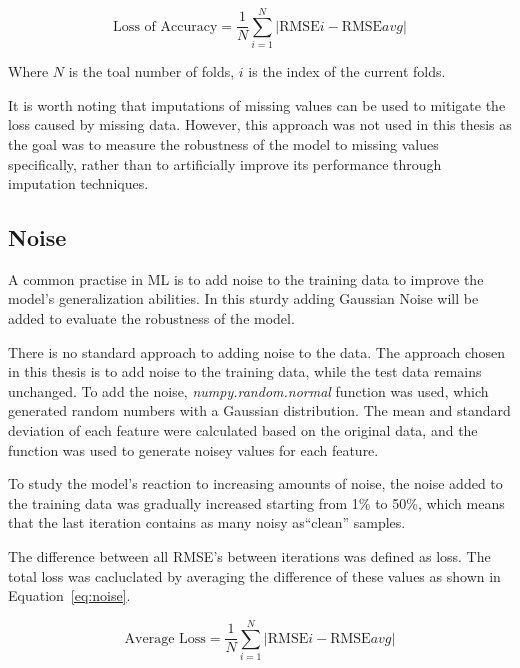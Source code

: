 \begin{tcolorbox}[arc=0pt,boxrule=0.5pt]
    \begin{equation}
        \label{eq:average_loss}
        \text{Loss of Accuracy} = \frac{1}{N} \sum_{i=1}^{N} |\text{RMSE}i - \text{RMSE}{avg}|
    \end{equation}
\end{tcolorbox}

Where $N$ is the toal number of folds, $i$ is the index of the current folds.

It is worth noting that imputations of missing values can be used to mitigate the loss
caused by missing data.
However, this approach was not used in this thesis as the goal
was to measure the robustness of the model to missing values specifically, rather than to
artificially improve its performance through imputation techniques.

\subsection{Noise}\label{subsec:noise}
A common practise in \ac{ML} is to add noise to the training data to improve the model's
generalization abilities.
In this sturdy adding Gaussian Noise will be added to evaluate the robustness of the model.

There is no standard approach to adding noise to the data. The approach chosen in this thesis
is to add noise to the training data, while the test data remains unchanged.
To add the noise, \textit{numpy.random.normal} function was used, which generated random numbers
with a Gaussian distribution.
The mean and standard deviation of each feature were calculated based on the original data, and
the function was used to generate noisey values for each feature.

To study the model's reaction to increasing amounts of noise, the noise added to the training
data was gradually increased starting from 1\% to 50\%, which means that the last iteration
contains as many noisy as``clean'' samples.

The difference between all \ac{RMSE}'s between iterations was defined as loss.
The total loss was cacluclated by averaging the difference of these values as shown in
Equation~\ref{eq:noise}.

\begin{tcolorbox}[arc=0pt,boxrule=0.5pt]
    \begin{equation}
        \text{Average Loss} = \frac{1}{N} \sum_{i=1}^{N} |\text{RMSE}i - \text{RMSE}{avg}|\label
        {eq:noise}
    \end{equation}
\end{tcolorbox}

